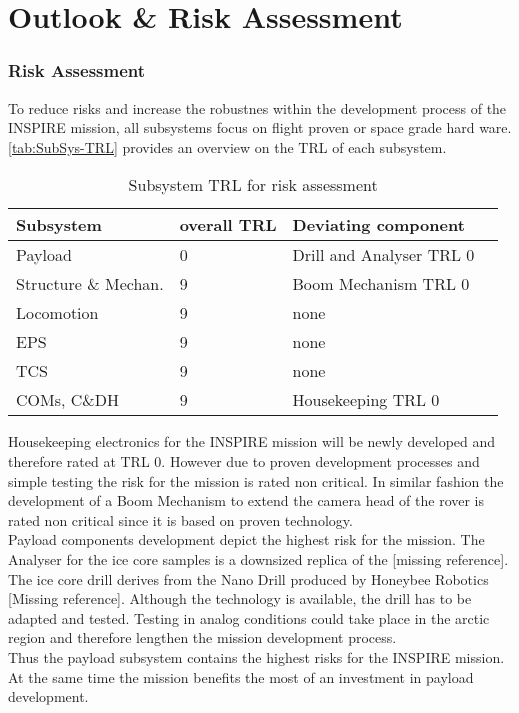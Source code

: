 \chapter{Outlook \& Risk Assessment}
\label{chap:outlook}

\subsection{Risk Assessment}

To reduce risks and increase the robustnes within the development process of the INSPIRE mission, all subsystems focus on flight proven or space grade hard ware. \autoref{tab:SubSys-TRL} provides an overview on the TRL of each subsystem. 
 
\begin{table}[h]
\centering
\begin{tabular}{llll}
Subsystem            & overall TRL & Deviating component      &  \\ \hline\hline
Payload              & 0           & Drill and Analyser TRL 0 &  \\
Structure \& Mechan. & 9           & Boom Mechanism TRL 0     &  \\
Locomotion           & 9           & none                     &  \\
EPS                  & 9           & none                     &  \\
TCS                  & 9           & none                     &  \\
COMs, C\&DH          & 9           & Housekeeping TRL 0       & 	 \\ \hline
\end{tabular}
\caption{Subsystem TRL for risk assessment}
\label{tab:SubSys-TRL}
\end{table}

Housekeeping electronics for the INSPIRE mission will be newly developed and therefore rated at TRL 0. However due to proven development processes and simple testing the risk for the mission is rated non critical. 
In similar fashion the development of a Boom Mechanism to extend the camera head of the rover is rated non critical since it is based on proven technology. \\

Payload components development depict the highest risk for the mission. The Analyser for the ice core samples is a downsized replica of the [missing reference]. 
The ice core drill derives from the Nano Drill produced by Honeybee Robotics [Missing reference]. Although the technology is available, the drill has to be adapted and tested. Testing in analog conditions could take place in the arctic region and therefore lengthen the mission development process. \\

Thus the payload subsystem contains the highest risks for the INSPIRE mission. At the same time the mission benefits the most of an investment in payload development. 